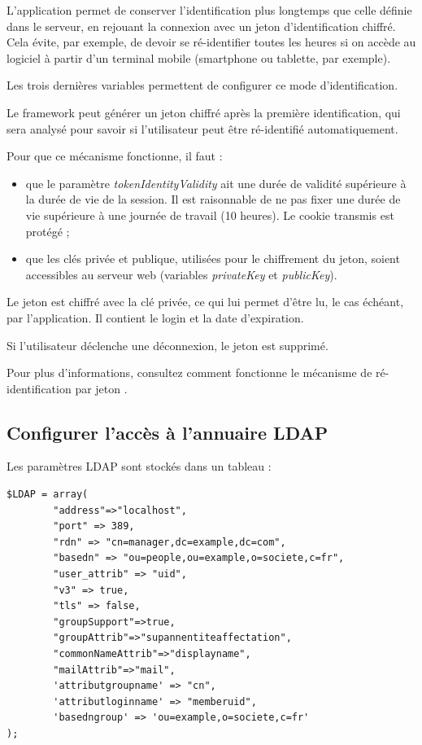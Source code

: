 L'application permet de conserver l'identification plus longtemps que celle définie dans le serveur, en rejouant la connexion avec un jeton d'identification chiffré. Cela évite, par exemple, de devoir se ré-identifier toutes les heures si on accède au logiciel à partir d'un terminal mobile (smartphone ou tablette, par exemple).

Les trois dernières variables permettent de configurer ce mode d'identification. 

Le framework peut générer un jeton chiffré après la première identification, qui sera analysé pour savoir si l'utilisateur peut être ré-identifié automatiquement.

Pour que ce mécanisme fonctionne, il faut :
\begin{itemize}
\item que le paramètre \textit{tokenIdentityValidity} ait une durée de validité supérieure à la durée de vie de la session. Il est raisonnable de ne pas fixer une durée de vie supérieure à une journée de travail (10 heures). Le cookie transmis est protégé ;
\item que les clés privée et publique, utilisées pour le chiffrement du jeton, soient accessibles au serveur web (variables \textit{privateKey} et \textit{publicKey}).
\end{itemize}

Le jeton est chiffré avec la clé privée, ce qui lui permet d'être lu, le cas échéant, par l'application. Il contient le login et la date d'expiration. 

Si l'utilisateur déclenche une déconnexion, le jeton est supprimé.

Pour plus d'informations, consultez comment fonctionne le mécanisme de ré-identification par jeton \cite{token}.

\subsection{Configurer l'accès à l'annuaire LDAP}

Les paramètres LDAP sont stockés dans un tableau :
\begin{lstlisting}
$LDAP = array(
		"address"=>"localhost",
		"port" => 389,
		"rdn" => "cn=manager,dc=example,dc=com",
		"basedn" => "ou=people,ou=example,o=societe,c=fr",
		"user_attrib" => "uid",
		"v3" => true,
		"tls" => false,
		"groupSupport"=>true,
		"groupAttrib"=>"supannentiteaffectation",
		"commonNameAttrib"=>"displayname",
		"mailAttrib"=>"mail",
		'attributgroupname' => "cn",
		'attributloginname' => "memberuid",
		'basedngroup' => 'ou=example,o=societe,c=fr'
);
\end{lstlisting}


